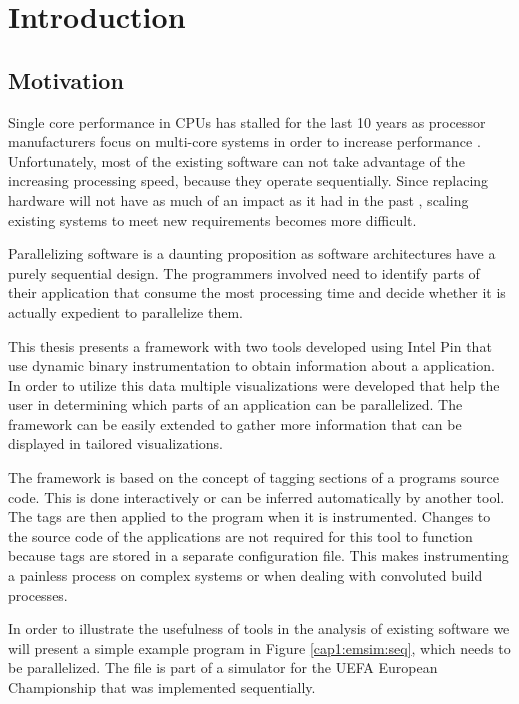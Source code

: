\chapter{Introduction}

\section {Motivation}

Single core performance in CPUs has stalled for the last 10 years as processor manufacturers focus on multi-core systems in order to increase performance \cite{procspeed2}. Unfortunately, most of the existing software can not take advantage of the increasing processing speed, because they operate sequentially. Since replacing hardware will not have as much of an impact as it had in the past \cite{procspeed}, scaling existing systems to meet new requirements becomes more difficult.

Parallelizing software is a daunting proposition as software architectures have a purely sequential design. The programmers involved need to identify parts of their application that consume the most processing time and decide whether it is actually expedient to parallelize them.

This thesis presents a framework with two tools developed using Intel Pin \cite{pin} that use dynamic binary instrumentation to obtain information about a application. In order to utilize this data multiple visualizations were developed that help the user in determining which parts of an application can be parallelized. The framework can be easily extended to gather more information that can be displayed in tailored visualizations.

The framework is based on the concept of tagging sections of a programs source code. This is done interactively or can be inferred automatically by another tool. The tags are then applied to the program when it is instrumented. Changes to the source code of the applications are not required for this tool to function because tags are stored in a separate configuration file. This makes instrumenting a painless process on complex systems or when dealing with convoluted build processes.

In order to illustrate the usefulness of tools in the analysis of existing software we will present a simple example program in Figure \ref{cap1:emsim:seq}, which needs to be parallelized. The file is part of a simulator for the UEFA European Championship that was implemented sequentially.

